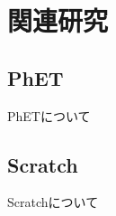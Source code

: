 \chapter{関連研究}

\section{PhET}

PhET\cite{PhET}について

\section{Scratch}

Scratch\cite{Scratch}について

\cite{Lpez2015ScratchAA}

